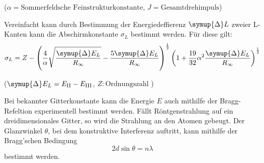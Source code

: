 \begin{center}
 \tiny {($\alpha=\text{Sommerfeldsche Feinstrukturkonstante}$, $J=\text{Gesamtdrehimpuls}$)}
\end{center}
Vereinfacht kann durch Bestimmung der Energiedeffierenz $\symup{\Delta} L$ zweier L-Kanten kann die Abschirmkonstante $\sigma_L$ bestimmt werden.
Für diese gilt:
\begin{equation}
  \sigma_L=Z-\left(\frac{4}{\alpha} \sqrt{ \frac {\symup{\Delta} E_L}{R_\infty} } -\frac{5\symup{\Delta} E_L}{R_\infty}\right)^{\frac{1}{2}} \left(1+\frac{19}{32}\alpha^2 \frac {\symup{\Delta} E_L}{R_\infty} \right)^{\frac{1}{2}}
  \label{eqn:sigL}
\end{equation}
\begin{center}
 \tiny {($\symup{\Delta} E_L=E_\text{II}- E_\text{III}$, $Z: \text{Ordnungszahl}$ )}
\end{center}
Bei bekannter Gitterkonstante kann die Energie $E$ auch mithilfe der Bragg-Refeltion experimentell bestimmt werden. Fällt Röntgenstrahlung auf ein dreidimensionales Gitter, so wird die Strahlung an den Atomen gebeugt.
Der Glanzwinkel $\theta$, bei dem konstruktive Interferenz auftritt, kann mithilfe der Bragg'schen Bedingung
\begin{equation}
  2d \sin{\theta} = n \lambda
\end{equation}
bestimmt werden.
